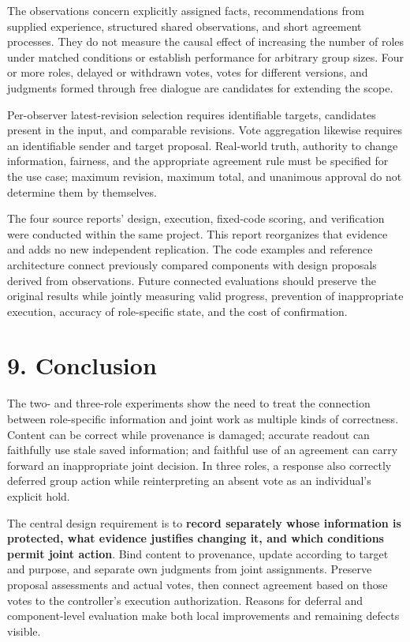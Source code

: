\documentclass[10pt,a4paper]{article}
\begin{document}
The observations concern explicitly assigned facts, recommendations from supplied experience, structured shared observations, and short agreement processes. They do not measure the causal effect of increasing the number of roles under matched conditions or establish performance for arbitrary group sizes. Four or more roles, delayed or withdrawn votes, votes for different versions, and judgments formed through free dialogue are candidates for extending the scope.

Per-observer latest-revision selection requires identifiable targets, candidates present in the input, and comparable revisions. Vote aggregation likewise requires an identifiable sender and target proposal. Real-world truth, authority to change information, fairness, and the appropriate agreement rule must be specified for the use case; maximum revision, maximum total, and unanimous approval do not determine them by themselves.

The four source reports' design, execution, fixed-code scoring, and verification were conducted within the same project. This report reorganizes that evidence and adds no new independent replication. The code examples and reference architecture connect previously compared components with design proposals derived from observations. Future connected evaluations should preserve the original results while jointly measuring valid progress, prevention of inappropriate execution, accuracy of role-specific state, and the cost of confirmation.

\section{9. Conclusion}\label{two-role-failure-design-conclusion}

The two- and three-role experiments show the need to treat the connection between role-specific information and joint work as multiple kinds of correctness. Content can be correct while provenance is damaged; accurate readout can faithfully use stale saved information; and faithful use of an agreement can carry forward an inappropriate joint decision. In three roles, a response also correctly deferred group action while reinterpreting an absent vote as an individual's explicit hold.

The central design requirement is to \textbf{record separately whose information is protected, what evidence justifies changing it, and which conditions permit joint action}. Bind content to provenance, update according to target and purpose, and separate own judgments from joint assignments. Preserve proposal assessments and actual votes, then connect agreement based on those votes to the controller's execution authorization. Reasons for deferral and component-level evaluation make both local improvements and remaining defects visible.
\end{document}
